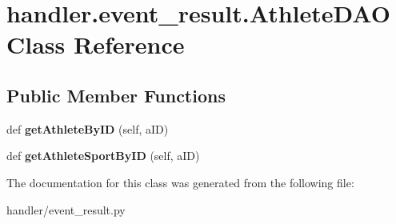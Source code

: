 \hypertarget{classhandler_1_1event__result_1_1_athlete_d_a_o}{}\section{handler.\+event\+\_\+result.\+Athlete\+D\+AO Class Reference}
\label{classhandler_1_1event__result_1_1_athlete_d_a_o}
\subsection*{Public Member Functions}
\begin{DoxyCompactItemize}
\item 
\mbox{\label{classhandler_1_1event__result_1_1_athlete_d_a_o_aae79d4ba7911c0735b204753c19ad663}} 
def {\bfseries get\+Athlete\+By\+ID} (self, a\+ID)
\item 
\mbox{\label{classhandler_1_1event__result_1_1_athlete_d_a_o_a7495e752007bc296d0cceefb8e903306}} 
def {\bfseries get\+Athlete\+Sport\+By\+ID} (self, a\+ID)
\end{DoxyCompactItemize}


The documentation for this class was generated from the following file\+:\begin{DoxyCompactItemize}
\item 
handler/event\+\_\+result.\+py\end{DoxyCompactItemize}
